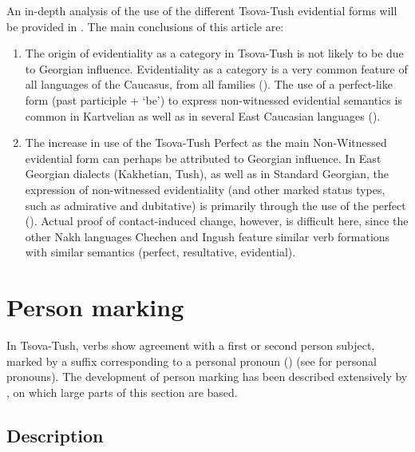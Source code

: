 An in-depth analysis of the use of the different Tsova-Tush evidential forms will be provided in \textcite{wsverhees2024nakhevid}. The main conclusions of this article are:

\begin{enumerate}
	\item The origin of evidentiality as a category in Tsova-Tush is not likely to be due to Georgian influence. Evidentiality as a category is a very common feature of all languages of the Caucasus, from all families (\cite{friedman1996balkancaucasus,friedman2000evidential}). The use of a perfect-like form (past participle + `be') to express non-witnessed evidential semantics is common in Kartvelian as well as in several East Caucasian languages (\cite{forker18,verhees19}).
	\item The increase in use of the Tsova-Tush Perfect as the main Non-Witnessed evidential form can perhaps be attributed to Georgian influence. In East Georgian dialects (Kakhetian, Tush), as well as in Standard Georgian, the expression of non-witnessed evidentiality (and other marked status types, such as admirative and dubitative) is primarily through the use of the perfect (\cite{boeder2000evidentiality}). Actual proof of contact-induced change, however, is difficult here, since the other Nakh languages Chechen and Ingush feature similar verb formations with similar semantics (perfect, resultative, evidential).
\end{enumerate}

\section{Person marking} \label{person} 

In Tsova-Tush, verbs show agreement with a first or second person subject, marked by a suffix corresponding to a personal pronoun (\cite{gagua52}) (see  for personal pronouns). The development of person marking has been described extensively by \textcite{kojima19}, on which large parts of this section are based. 

\subsection{Description} \label{persondescription}

